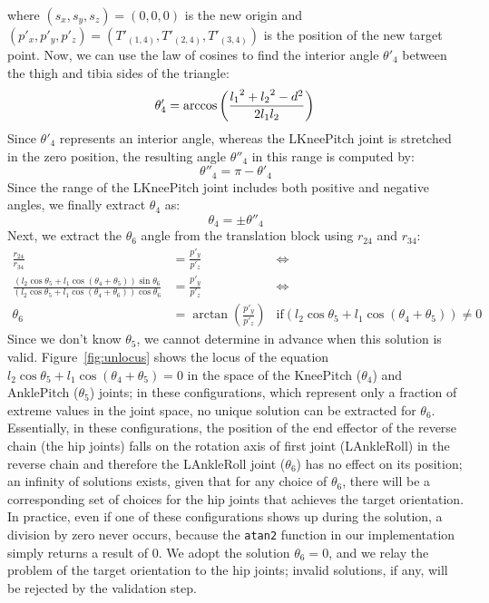 where $(s_x, s_y, s_z) = (0,0,0)$ is the new origin and $(p'_x, p'_y, p'_z) = (T'_{(1,4)}, T'_{(2,4)}, T'_{(3,4)})$ is the position of the new target point. Now, we can use the law of cosines to find the interior angle $\theta'_4$ between the thigh and tibia sides of the triangle:
\[
\theta'_4 =\arccos\left(\frac{{l_1}^2 + {l_2}^2 - d^2}{2 l_1 l_2}\right)\\
\]
Since $\theta'_4$ represents an interior angle, whereas the LKneePitch joint is stretched in the zero position, the resulting angle $\theta''_4$ in this range is computed by:
\[
\theta''_4 = \pi - \theta'_4
\]
Since the range of the LKneePitch joint includes both positive and negative angles, we finally extract $\theta_4$ as:
\[
\theta_4 = \pm\theta''_4
\]
Next, we extract the $\theta_6$ angle from the translation block using $r_{24}$ and $r_{34}$:
\begin{align*}
\frac{r_{24}}{r_{34}} &= \frac{p'_y}{p'_z} &\Leftrightarrow \\
\frac{\left(l_2\cos\theta_5 + l_1 \cos\left(\theta_4 + \theta_5\right)\right)\sin\theta_6}{\left(l_2\cos\theta_5 + l_1 \cos\left(\theta_4 + \theta_6\right)\right) \cos\theta_6} &= \frac{p'_y}{p'_z} &\Leftrightarrow \\
\theta_6 &= \arctan\left(\frac{p'_y}{p'_z}\right)&\text{if} \left(l_2\cos\theta_5 + l_1 \cos\left(\theta_4 + \theta_5\right)\right) \neq 0
\end{align*}
Since we don't know $\theta_5$, we cannot determine in advance when this solution is valid. Figure~\ref{fig:unlocus} shows the locus of the equation $l_2\cos\theta_5 + l_1 \cos\left(\theta_4 + \theta_5\right) = 0$ in the space of the KneePitch ($\theta_4$) and AnklePitch ($\theta_5$) joints; in these configurations, which represent only a fraction of extreme values in the joint space, no unique solution can be extracted for $\theta_6$. Essentially, in these configurations, the position of the end effector of the reverse chain (the hip joints) falls on the rotation axis of first joint (LAnkleRoll) in the reverse chain and therefore the LAnkleRoll joint ($\theta_6$) has no effect on its position; an infinity of solutions exists, given that for any choice of $\theta_6$, there will be a corresponding set of choices for the hip joints that achieves the target orientation. In practice, even if one of these configurations shows up during the solution, a division by zero never occurs, because the {\tt atan2} function in our implementation simply returns a result of 0. We adopt the solution $\theta_6=0$, and we relay the problem of the target orientation to the hip joints; invalid solutions, if any, will be rejected by the validation step.

